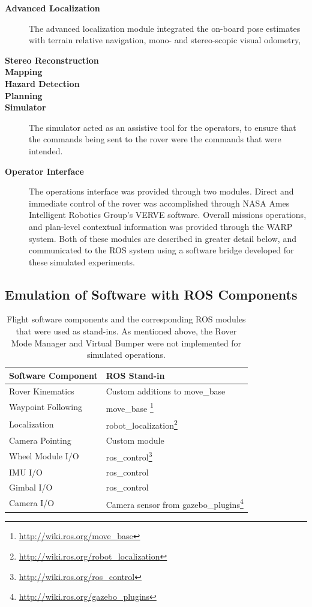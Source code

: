 \documentclass[twocolumn,letterpaper]{IEEEAerospaceCLS}  %
\begin{document}
\begin{description}
\item[\textbf{Advanced Localization}]  The advanced localization module integrated the on-board pose estimates with terrain relative navigation, mono- and stereo-scopic visual odometry, 
\item[\textbf{Stereo Reconstruction}]
\item[\textbf{Mapping}]
\item[\textbf{Hazard Detection}]
\item[\textbf{Planning}]
\item[\textbf{Simulator}]  The simulator acted as an assistive tool for the operators, to ensure that the commands being sent to the rover were the commands that were intended.  
\item[\textbf{Operator Interface}]  The operations interface was provided through two modules.  Direct and immediate control of the rover was accomplished through NASA Ames Intelligent Robotics Group's VERVE software.  Overall missions operations, and plan-level contextual information was provided through the WARP system.  Both of these modules are described in greater detail below, and communicated to the ROS system using a software bridge developed for these simulated experiments.
\end{description}

\subsection{Emulation of Software with ROS Components}

\begin{table}[htp]
\caption{Flight software components and the corresponding ROS modules that were used as stand-ins.  As mentioned above, the Rover Mode Manager and Virtual Bumper were not implemented for simulated operations.\label{tbl:flight-software-components}}
\begin{tabular}{l|l}
\textbf{Software Component} & \textbf{ROS Stand-in} \\
\hline
Rover Kinematics &  Custom additions to move\_base\\
Waypoint Following & move\_base \footnote{\url{http://wiki.ros.org/move_base}}\\
Localization & robot\_localization\footnote{\url{http://wiki.ros.org/robot_localization}}\\
Camera Pointing & Custom module \\
Wheel Module I/O & ros\_control\footnote{\url{http://wiki.ros.org/ros_control}}\\
IMU I/O & ros\_control\\
Gimbal I/O & ros\_control\\
Camera I/O & Camera sensor from gazebo\_plugins\footnote{\url{http://wiki.ros.org/gazebo_plugins}}\\
\hline
\end{tabular}
\end{table}
\end{document}
